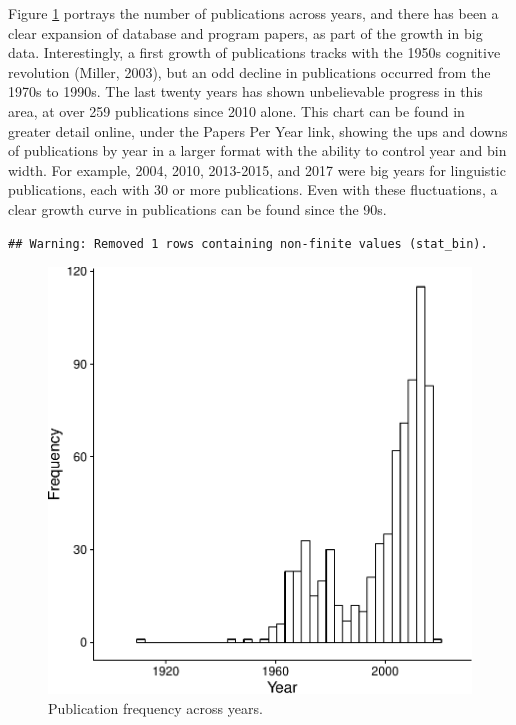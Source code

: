 \documentclass[english,man]{apa6}
\theoremstyle{definition}
\theoremstyle{definition}
\theoremstyle{definition}
\theoremstyle{remark}
\begin{document}
Figure \ref{fig:pub-fig} portrays the number of publications across
years, and there has been a clear expansion of database and program
papers, as part of the growth in big data. Interestingly, a first growth
of publications tracks with the 1950s cognitive revolution (Miller,
2003), but an odd decline in publications occurred from the 1970s to
1990s. The last twenty years has shown unbelievable progress in this
area, at over 259 publications since 2010 alone. This chart can be found
in greater detail online, under the Papers Per Year link, showing the
ups and downs of publications by year in a larger format with the
ability to control year and bin width. For example, 2004, 2010,
2013-2015, and 2017 were big years for linguistic publications, each
with 30 or more publications. Even with these fluctuations, a clear
growth curve in publications can be found since the 90s.

\begin{verbatim}
## Warning: Removed 1 rows containing non-finite values (stat_bin).
\end{verbatim}

\begin{figure}
\centering
\includegraphics{LAB_files/figure-latex/pub-fig-1.pdf}
\caption{\label{fig:pub-fig}Publication frequency across years.}
\end{figure}
\end{document}
